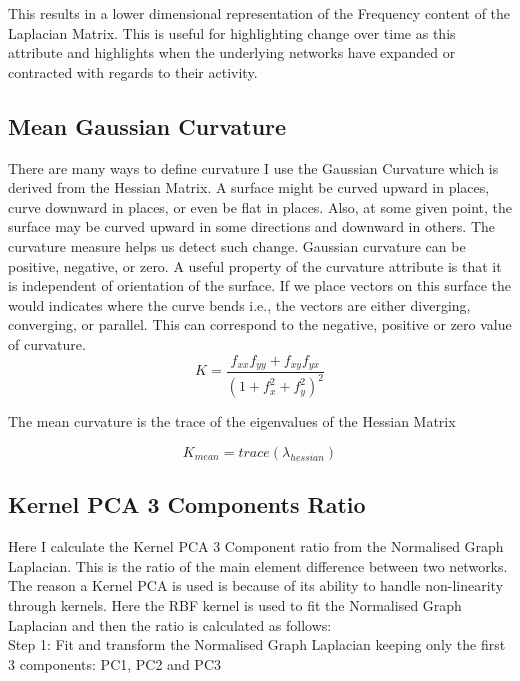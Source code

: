 This results in a lower dimensional representation of the Frequency content of the Laplacian Matrix. This is useful for highlighting change over time as this attribute and highlights when the underlying networks have expanded or contracted with regards to their activity.

\subsection{Mean Gaussian Curvature}

There are many ways to define curvature I use the Gaussian Curvature which is derived from the Hessian Matrix. A surface might be curved upward in places, curve downward in places, or even be flat in places. Also, at some given point, the surface may be curved upward in some directions and downward in others. The curvature measure helps us detect such change. Gaussian curvature can be positive, negative, or zero. A useful property of the curvature attribute is that it is independent of orientation of the surface. If we place vectors on this surface the would indicates where the curve bends i.e., the vectors are either diverging, converging, or parallel. This can correspond to the negative, positive or zero value of curvature.
\\
\begin{equation}
      K = \frac{f_{xx}f_{yy}+f_{xy}f_{yx}}{(1+ f_x^2 + f_y^2)^2}
\end{equation}

The mean curvature is the trace of the eigenvalues of the Hessian Matrix 

\begin{equation}
      K_{mean} = trace(\lambda_{hessian}) 
\end{equation}

\subsection{Kernel PCA 3 Components Ratio}

Here I calculate the Kernel PCA 3 Component ratio from the Normalised Graph Laplacian. This is the ratio of the main element difference between two networks. The reason a Kernel PCA is used is because of its ability to handle non-linearity through kernels. Here the RBF kernel is used to fit the Normalised Graph Laplacian and then the ratio is calculated as follows:\\

Step 1: Fit and transform the Normalised Graph Laplacian keeping only the first 3 components: PC1, PC2 and PC3\\

